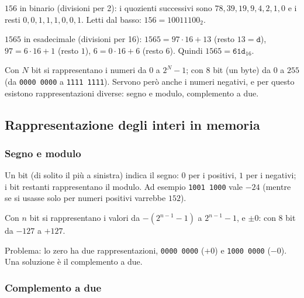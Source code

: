 \documentclass[11pt,a4paper]{article}
\begin{document}
\begin{esempio}
$156$ in binario (divisioni per 2): i quozienti successivi sono
$78, 39, 19, 9, 4, 2, 1, 0$ e i resti $0, 0, 1, 1, 1, 0, 0, 1$. Letti dal basso:
$156 = 10011100_2$.

$1565$ in esadecimale (divisioni per 16): $1565 = 97 \cdot 16 + 13$ (resto
$13 = \texttt{d}$), $97 = 6 \cdot 16 + 1$ (resto $1$), $6 = 0 \cdot 16 + 6$
(resto $6$). Quindi $1565 = \texttt{61d}_{16}$.
\end{esempio}

Con $N$ bit si rappresentano i numeri da $0$ a $2^N - 1$; con 8 bit (un byte)
da $0$ a $255$ (da \texttt{0000 0000} a \texttt{1111 1111}). Servono però anche i
numeri negativi, e per questo esistono rappresentazioni diverse: segno e modulo,
complemento a due.

\subsection{Rappresentazione degli interi in memoria}

\subsubsection{Segno e modulo}

Un bit (di solito il più a sinistra) indica il segno: $0$ per i positivi, $1$ per
i negativi; i bit restanti rappresentano il modulo. Ad esempio \texttt{1001 1000}
vale $-24$ (mentre se si usasse solo per numeri positivi varrebbe $152$).

Con $n$ bit si rappresentano i valori da $-(2^{n-1} - 1)$ a $2^{n-1} - 1$, e
$\pm 0$: con 8 bit da $-127$ a $+127$.

\begin{osservazione}
Problema: lo zero ha due rappresentazioni, \texttt{0000 0000} ($+0$) e
\texttt{1000 0000} ($-0$). Una soluzione è il complemento a due.
\end{osservazione}

\subsubsection{Complemento a due}
\end{document}
